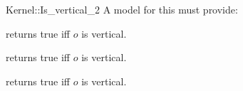 \begin{ccRefFunctionObjectConcept}{Kernel::Is_vertical_2}
A model for this must provide:


{returns true iff $o$ is vertical.}

{returns true iff $o$ is vertical.}

{returns true iff $o$ is vertical.}

\ccIsModel{}

\end{ccRefFunctionObjectConcept}
